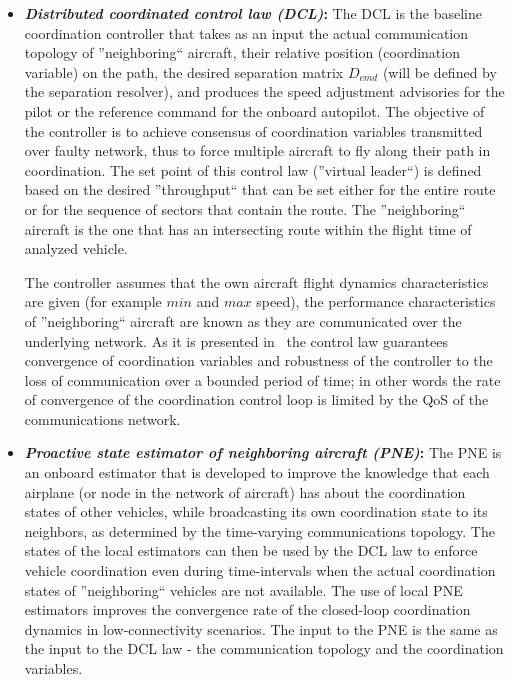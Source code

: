 \documentclass[letter,onecolumn,12pt]{aiaa-tc}
\newcommand{\1}{1_n}
\begin{document}
\begin{itemize}
\setlength{\itemsep}{-1pt}
\vspace{-2mm}

\item \textbf{\emph{Distributed coordinated control law (DCL)}:} The DCL is the baseline coordination controller that takes as an input the actual communication topology of ''neighboring`` aircraft, their relative position (coordination variable) on the path, the desired separation matrix $D_{cmd}$ (will be defined by the separation resolver),  and produces the speed adjustment advisories for the pilot or the reference command for the onboard autopilot. The objective of the controller is to achieve consensus of coordination variables transmitted over faulty network, thus to force multiple aircraft to fly along their path in coordination. The set point of this control law (''virtual leader``) is defined based on the desired ''throughput`` that can be set either for the entire route or for the sequence of sectors that contain the route.  The ''neighboring`` aircraft is the one that has an intersecting route within the flight time of analyzed vehicle.

The controller assumes that the own aircraft flight dynamics characteristics are given (for example $min$ and $max$ speed), the performance characteristics of ''neighboring`` aircraft are known as they are communicated over the underlying network. As it is presented in~\cite{xargay2012csm} the control law guarantees convergence of coordination variables and robustness of the controller to the loss of communication over a bounded period of time; in other words the rate of convergence of the coordination control loop is limited by the QoS of the communications network.

\item \textbf{\emph{Proactive state estimator of neighboring aircraft (PNE)}:} The PNE is an onboard estimator that is developed to improve the knowledge that each airplane (or node in the network of aircraft) has about the coordination states of other vehicles, while  broadcasting its own coordination state to its neighbors, as determined by the time-varying communications topology. The states of the local estimators can then be used by the DCL law to enforce vehicle coordination even during time-intervals when the actual coordination states of ''neighboring`` vehicles are not available. The use of local PNE estimators improves the convergence rate of the closed-loop coordination dynamics in low-connectivity scenarios. The input to the PNE is the same as the input to the DCL law - the communication topology and the coordination variables.


\end{itemize}
\end{document}
